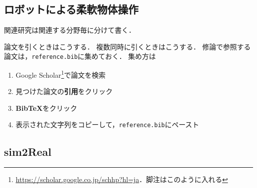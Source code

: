 \subsection{ロボットによる柔軟物体操作}
関連研究は関連する分野毎に分けて書く．


\vspace{10truemm}

論文を引くときはこうする\cite{hinton2007learning}．
複数同時に引くときはこうする\cite{le2013building, ran2013genome, sutton2018reinforcement}．
修論で参照する論文は，\texttt{reference.bib}に集めておく．
集め方は
\begin{enumerate}
    \item Google Scholar\footnote{\url{https://scholar.google.co.jp/schhp?hl=ja}．脚注はこのように入れる}で論文を検索
    \item 見つけた論文の{\bf 引用}をクリック
    \item {\bf BibTeX}をクリック
    \item 表示された文字列をコピーして，\texttt{reference.bib}にペースト
\end{enumerate}

\subsection{sim2Real}

